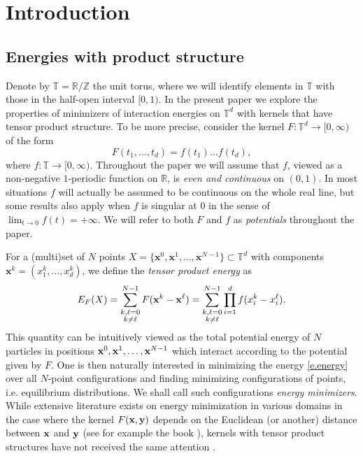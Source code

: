 \documentclass[a4paper,12pt]{article}
\numberwithin{equation}{section}
\theoremstyle{definition}
\newcommand{\bx}{\mathbf{x}}
\newcommand{\bbR}{\mathbb{R}}
\newcommand{\bbT}{\mathbb{T}}
\newcommand{\bbZ}{\mathbb{Z}}
\newcommand{\ra}{\rightarrow}
\begin{document}
\section{Introduction}

\subsection{Energies with product structure}

Denote by $\bbT = \bbR/\bbZ$ the unit  torus, where we will identify elements in $\bbT$ with those in the half-open interval $[0, 1)$. In the present paper we explore the properties of minimizers of  interaction energies on $\mathbb T^d$ with kernels that have tensor product structure.  To be more precise, consider the kernel  $F: \mathbb T^d  \rightarrow [0, \infty)$ of the form 
\begin{equation}\label{e.f}
F(t_1, \dots, t_d)  = f(t_1) \dots f(t_d), 
\end{equation}
where %
$f: \bbT \ra [0, \infty)$. Throughout the paper we will assume that $f$, viewed  as   a non-negative  $1$-periodic function on $\bbR$, is \emph{even and continuous} on $(0,1)$. In most situations $f$ will actually be assumed to be continuous on the whole real line, but some  results also apply when $f$ is singular at $0$ in the sense of $\lim_{t \ra 0}f(t) = + \infty$. We will refer to both $F$ and $f$ as \emph{potentials} throughout the paper.


For a (multi)set of $N$ points $X = \{ \bx^0, \bx^1, \dots, \bx^{N-1} \} \subset \mathbb T^d$ with components $\bx^k = (x^k_1, \dots, x^k_d)$, we define the \emph{tensor product energy} as 
\begin{equation}\label{e.energy}
E_F(X) %
= \sum_{\substack{k, \ell=0 \\ k \neq \ell}}^{N-1}F({\bf{x}}^k -  {\bf{x}}^\ell) = \sum_{\substack{k, \ell=0 \\ k \neq \ell}}^{N-1} \prod_{i=1}^d  f(x_i^k - x_i^\ell).
\end{equation}
This quantity can be intuitively viewed as the total potential energy of $N$ particles in positions ${\bf x}^0, \bx^1, \dots, {\bf x}^{N-1} $ which interact according to the potential given by $F$. One is then naturally interested in minimizing the energy \eqref{e.energy} over all $N$-point configurations and finding minimizing configurations of points, i.e.  equilibrium distributions. We shall call such configurations \emph{energy minimizers}. While extensive literature  exists on energy minimization in various domains in the case where the kernel $F({\bf{x}}, {\bf{y}})$ depends on the Euclidean (or another) distance between ${\bf{x}}$ and  ${\bf{y}}$ (see for example the book \cite{BHS}), kernels with tensor product structures have not received the same attention \cite{HO16, Nag25b}. %
\end{document}
